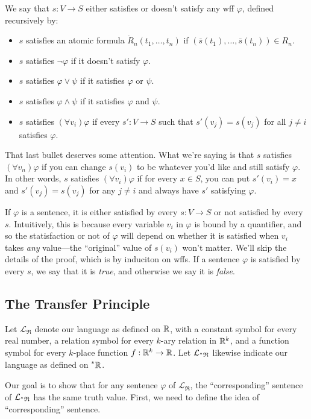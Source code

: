 We say that $s: V \to S$ either satisfies or doesn't satisfy any wff $\varphi$, defined recursively by:
\begin{itemize}
    \item $s$ satisfies an atomic formula $\dot R_n(t_1, \ldots, t_n)$ if $(\bar s(t_1), \ldots, \bar s(t_n)) \in R_n$.
    \item $s$ satisfies $\neg \varphi$ if it doesn't satisfy $\varphi$.
    \item $s$ satisfies $\varphi \lor \psi$ if it satisfies $\varphi$ or $\psi$.
    \item $s$ satisfies $\varphi \land \psi$ if it satisfies $\varphi$ and $\psi$.
    \item $s$ satisfies $(\forall v_i) \varphi$ if every $s': V \to S$ such that $s'(v_j) = s(v_j)$ for all $j \neq i$ satisfies $\varphi$.
\end{itemize}
That last bullet deserves some attention. What we're saying is that $s$ satisfies $(\forall v_n) \varphi$ if you can change $s(v_i)$ to be whatever you'd like and still satisfy $\varphi$. In other words, $s$ satisfies $(\forall v_i) \varphi$ if for every $x \in S$, you can put $s'(v_i) = x$ and $s'(v_j) = s(v_j)$ for any $j \neq i$ and always have $s'$ satisfying $\varphi$.

If $\varphi$ is a sentence, it is either satisfied by every $s: V \to S$ or not satisfied by every $s$. Intuitively, this is because every variable $v_i$ in $\varphi$ is bound by a quantifier, and so the statisfaction or not of $\varphi$ will depend on whether it is satisfied when $v_i$ takes \textit{any} value---the ``original'' value of $s(v_i)$ won't matter. We'll skip the details of the proof, which is by induciton on wffs. If a sentence $\varphi$ is satisfied by every $s$, we say that it is \textit{true}, and otherwise we say it is \textit{false}.

\subsection{The Transfer Principle}
Let $\mathcal{L}_\mathfrak{R}$ denote our language as defined on $\mathbb{R}$, with a constant symbol for every real number, a relation symbol for every $k$-ary relation in $\mathbb{R}^k$, and a function symbol for every $k$-place function $f: \mathbb{R}^k \to \mathbb{R}$. Let $\mathcal{L}_{\prescript{*}{}{\mathfrak{R}}}$ likewise indicate our language as defined on $\prescript{*}{}{\mathbb{R}}$.

Our goal is to show that for any sentence $\varphi$ of $\mathcal{L}_\mathfrak{R}$, the ``corresponding'' sentence of $\mathcal{L}_{\prescript{*}{}{\mathfrak{R}}}$ has the same truth value. First, we need to define the idea of ``corresponding'' sentence. 

